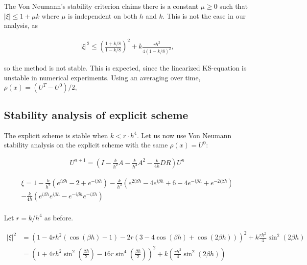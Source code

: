 


The Von Neumann's stability criterion claims there is a constant $\mu \ge 0$ such that $|\xi| \le 1+ \mu k$ where $\mu$ is independent on both $h$ and $k$. This is not the case in our analysis, as 

\begin{align*}
|\xi |^2 \le \left(\frac{1+k/8}{1-k/8}\right)^2 + k\frac{rh^2}{4(1-k/8)^2},
\end{align*}

 so the method is not stable. This is expected, since the linearized KS-equation is unstable in numerical experiments. Using an averaging over time, $\rho(x) = (U^T-U^0)/2$, 


\subsection*{Stability analysis of explicit scheme}

The explicit scheme is stable when $k < r \cdot h^4$. Let us now use Von Neumann stability analysis on the explicit scheme with the same $\rho(x) = U^0$:


\begin{align*}
U^{n+1} = \left(I - \frac{k}{h^2}A - \frac{k}{h^4}A^2 - \frac{k}{4h} DR\right)U^{n} 
\end{align*}


\begin{align*}
\xi = 1 - \frac{k}{h^2}(e^{i\beta h}-2+e^{-i\beta h}) - \frac{k}{h^4}(e^{2i\beta h}-4e^{i\beta h}+6-4e^{-i\beta h}+e^{-2i\beta h}) \\
 - \frac{k}{4h}(e^{i\beta h}e^{i\beta h} - e^{-i\beta h}e^{-i\beta h})\\
\end{align*}

Let $r = k/h^4$ as before.

\begin{align*}
|\xi |^2 &= (1-4rh^2(\cos(\beta h)-1)-2r(3-4\cos(\beta h)+\cos(2\beta h)))^2 + k\frac{rh^2}{4}\sin^2(2\beta h) \\
&= \left(1+4rh^2\sin^2\left(\frac{\beta h}{2}\right)-16r\sin^4\left(\frac{\beta h}{2}\right)\right)^2 + k\left(\frac{rh^2}{4}\sin^2(2\beta h)\right)
\end{align*}

